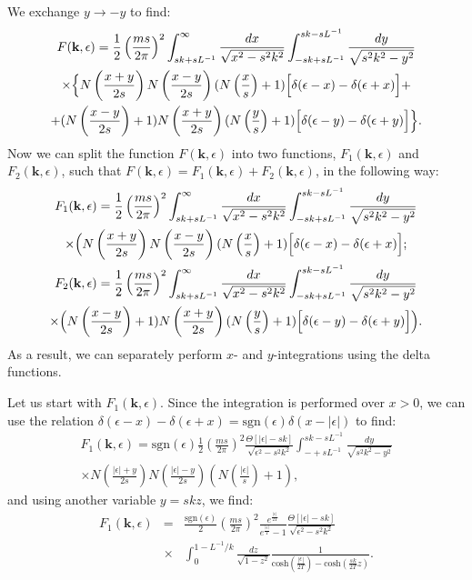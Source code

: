%
We exchange $y\rightarrow-y$ to find:
%
\begin{gather}
F(\textbf{k},\epsilon)=\frac{1}{2}\left(\frac{ms}{2\pi}\right)^2
\int_{sk+sL^{-1}}^\infty \frac{dx}{\sqrt{x^2-s^2k^2}}
\int_{-sk+sL^{-1}}^{sk-sL^{-1}} \frac{dy}{\sqrt{s^2k^2-y^2}}
\\
\nonumber
\times
\Bigl\{
N\left(\frac{x+y}{2s}\right)N\left(\frac{x-y}{2s}\right)(N\left(\frac{x}{s}\right)+1)
\Bigl[\delta(\epsilon-x)
-
\delta(\epsilon+x)\Bigl]+\\
\nonumber
+
(N\left(\frac{x-y}{2s}\right)+1)N\left(\frac{x+y}{2s}\right)(N\left(\frac{y}{s}\right)+1)
\Bigr[\delta(\epsilon-y)
-
\delta(\epsilon+y)\Bigr]
\Bigr\}.
\end{gather}
%
Now we can split the function $F(\textbf{k},\epsilon)$ into two functions, $F_1(\textbf{k},\epsilon)$ and $F_2(\textbf{k},\epsilon)$, such that $F(\textbf{k},\epsilon)=F_1(\textbf{k},\epsilon)+F_2(\textbf{k},\epsilon)$, in the following way:
%
\begin{gather}
F_1(\textbf{k},\epsilon)=\frac{1}{2}\left(\frac{ms}{2\pi}\right)^2
\int_{sk+sL^{-1}}^\infty \frac{dx}{\sqrt{x^2-s^2k^2}}
\int_{-sk+sL^{-1}}^{sk-sL^{-1}} \frac{dy}{\sqrt{s^2k^2-y^2}}
\\
\nonumber
\times\Bigl(
N\left(\frac{x+y}{2s}\right)N\left(\frac{x-y}{2s}\right)(N\left(\frac{x}{s}\right)+1)
\Bigl[\delta(\epsilon-x)
-
\delta(\epsilon+x)\Bigl];
\\
\nonumber
F_2(\textbf{k},\epsilon)=\frac{1}{2}\left(\frac{ms}{2\pi}\right)^2
\int_{sk+sL^{-1}}^\infty \frac{dx}{\sqrt{x^2-s^2k^2}}
\int_{-sk+sL^{-1}}^{sk-sL^{-1}} \frac{dy}{\sqrt{s^2k^2-y^2}}
\\
\nonumber
\times\Bigl(N\left(\frac{x-y}{2s}\right)+1)N\left(\frac{x+y}{2s}\right)(N\left(\frac{y}{s}\right)+1)
\Bigr[\delta(\epsilon-y)
-
\delta(\epsilon+y)\Bigr]
\Bigr).
\end{gather}
%
As a result, we can separately perform $x$- and $y$-integrations using the delta functions.

Let us start with $F_1(\textbf{k},\epsilon)$. Since the integration is performed over $x>0$, we can use the relation $\delta(\epsilon-x)-\delta(\epsilon+x)=\textrm{sgn}(\epsilon)\delta(x-|\epsilon|)$ to find: 
%
\begin{gather}
F_1(\textbf{k},\epsilon)=\mathrm{sgn}(\epsilon)\frac{1}{2}\left(\frac{ms}{2\pi}\right)^2\frac{\Theta[|\epsilon|-sk]}{\sqrt{\epsilon^2-s^2k^2}}
\int_{-+sL^{-1}}^{sk-sL^{-1}} \frac{dy}{\sqrt{s^2k^2-y^2}}
\\
\nonumber
\times
N\left(\frac{|\epsilon|+y}{2s}\right)N\left(\frac{|\epsilon|-y}{2s}\right)(N\left(\frac{|\epsilon|}{s}\right)+1),
\end{gather}
%
and using another variable $y=skz$, we find:
%
\begin{eqnarray}
    F_1(\textbf{k},\epsilon)&=& \frac{\mathrm{sgn}(\epsilon)}{2}\left(\frac{ms}{2\pi}\right)^2\frac{e^{\frac{|\epsilon|}{2T}}}{e^{\frac{|\epsilon|}{T}}-1}\frac{\Theta[|\epsilon|-sk]}{\sqrt{\epsilon^2-s^2k^2}} \\ \nonumber
    &\times& \int_{0}^{1-L^{-1}/k} \frac{dz}{\sqrt{1-z^2}}
\frac{1}{\mathrm{cosh}
\left(\frac{|\epsilon|}{2T}\right) - \mathrm{cosh}\left(\frac{sk}{2T}z\right)}.
\end{eqnarray}
%

